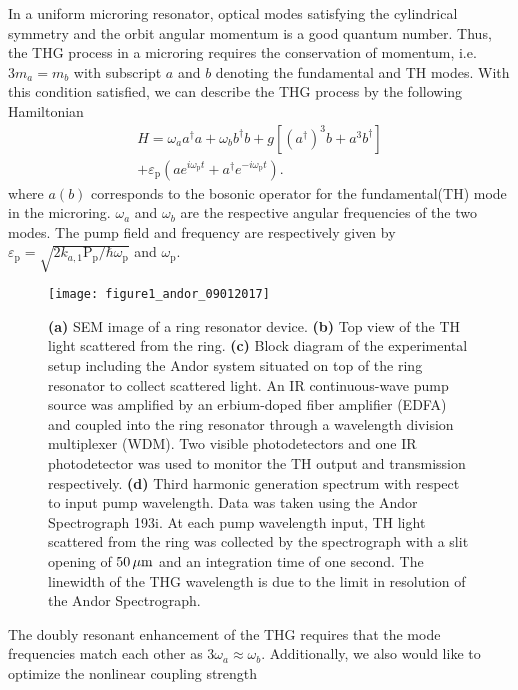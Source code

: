 \documentclass[9pt,twocolumn,twoside]{optica}
\begin{document}
In a uniform microring resonator, optical modes satisfying the cylindrical symmetry and the orbit angular momentum is a good quantum number. Thus, the THG process in a microring requires the conservation of momentum, i.e. $3m_{a}=m_{b}$ with subscript $a$ and $b$ denoting the fundamental and TH modes. With this condition satisfied, we can describe the THG process by the following Hamiltonian
\begin{equation}
\begin{split}
H=\omega_{a}a^{\dagger}a+\omega_{b}b^{\dagger}b+g[(a^{\dagger})^{3}b+a^{3}b^{\dagger}] \\
+\varepsilon_{\mathrm{p}}(ae^{i\omega_{\mathrm{p}}t}+a^{\dagger}e^{-i\omega_{\mathrm{p}}t}).
\end{split}
\label{eq:hamiltonian}
\end{equation}
%
where $a(b)$ corresponds to the bosonic operator for the fundamental(TH) mode in the microring. $\omega_{a}$ and $\omega_{b}$ are the respective angular frequencies of the two modes. The pump field and frequency are respectively given by $\varepsilon_{\mathrm{p}}=\sqrt{2k_{a,1}\mathrm{P}_{\mathrm{p}}/\hbar\omega_{\mathrm{p}}}$ and $\omega_{\mathrm{p}}$. 
%
\begin{figure}[t]
\centering
\texttt{[image: figure1\_andor\_09012017]}
\caption{\textbf{(a)} SEM image of a ring resonator device. \textbf{(b)} Top view of the TH light scattered from the ring. \textbf{(c)} Block diagram of the experimental setup including the Andor system situated on top of the ring resonator to collect scattered light. An IR continuous-wave pump source was amplified by an erbium-doped fiber amplifier (EDFA) and coupled into the ring resonator through a wavelength division multiplexer (WDM). Two visible photodetectors and one IR photodetector was used to monitor the TH output and transmission respectively. \textbf{(d)} Third harmonic generation spectrum with respect to input pump wavelength. Data was taken using the Andor Spectrograph 193i. At each pump wavelength input, TH light scattered from the ring was collected by the spectrograph with a slit opening of $50\thinspace\mu \mathrm{m}$ and an integration time of one second. The linewidth of the THG wavelength is due to the limit in resolution of the Andor Spectrograph.}
\label{fig:setup}
\end{figure}
%
The doubly resonant enhancement of the THG requires that the mode frequencies match each other as $3\omega_{a}\approx\omega_{b}$. Additionally, we also would like to optimize the nonlinear coupling strength
\end{document}
